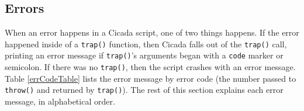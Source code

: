 \documentclass{article}
\begin{document}





\subsection{Errors}

When an error happens in a Cicada script, one of two things happens.  If the error happened inside of a \verb#trap()# function, then Cicada falls out of the \verb#trap()# call, printing an error message if \verb#trap()#'s arguments began with a \verb#code# marker or semicolon.  If there was no \verb#trap()#, then the script crashes with an error message.  Table \ref{errCodeTable} lists the error message by error code (the number passed to \verb#throw()# and returned by \verb#trap()#).  The rest of this section explains each error message, in alphabetical order.
\end{document}
